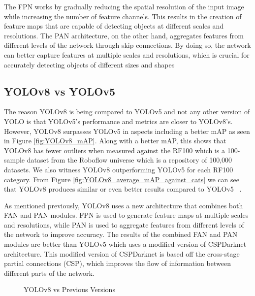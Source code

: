 \documentclass[10pt,twocolumn,letterpaper]{article}
\begin{document}
The FPN works by gradually reducing the spatial resolution of the input image while increasing the number of feature channels. This results in the creation of feature maps that are capable of detecting objects at different scales and resolutions. The PAN architecture, on the other hand, aggregates features from different levels of the network through skip connections. By doing so, the network can better capture features at multiple scales and resolutions, which is crucial for accurately detecting objects of different sizes and shapes ~\cite{CompReview}

\subsection{YOLOv8 vs YOLOv5}
The reason YOLOv8 is being compared to YOLOv5 and not any other version of YOLO is that YOLOv5’s performance and metrics are closer to YOLOv8’s. However, YOLOv8 surpasses YOLOv5 in aspects including a better mAP as seen in Figure \ref{fig:YOLOv8_mAP}. Along with a better mAP, this shows that YOLOv8 has fewer outliers when measured against the RF100 which is a 100-sample dataset from the Roboflow universe which is a repository of 100,000 datasets. We also witness YOLOv8 outperforming YOLOv5 for each RF100 category. From Figure \ref{fig:YOLOv8_average_mAP_against_cats} we can see that YOLOv8 produces similar or even better results compared to YOLOv5 ~\cite{YOLOv8Website}.

As mentioned previously, YOLOv8 uses a new architecture that combines both FAN and PAN modules. FPN is used to generate feature maps at multiple scales and resolutions, while PAN is used to aggregate features from different levels of the network to improve accuracy. The results of the combined FAN and PAN modules are better than YOLOv5 which uses a modified version of CSPDarknet architecture. This modified version of CSPDarknet is based off the cross-stage partial connections (CSP), which improves the flow of information between different parts of the network.

\begin{figure}[h]
    \centering
    \qquad
    \caption{YOLOv8 vs Previous Versions}%
    \label{fig:Model_Evaluation2}
\end{figure}
\end{document}

